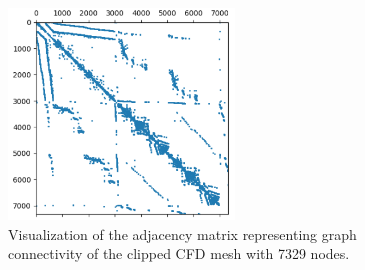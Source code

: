 \begin{figure}[ht]
    \centering
    \includegraphics[width=6cm]{images/Methodology/AdjMatrix.png}
    \caption{Visualization of the adjacency matrix representing graph connectivity of the clipped CFD mesh with 7329 nodes.}
    \label{adjmat}
\end{figure}
